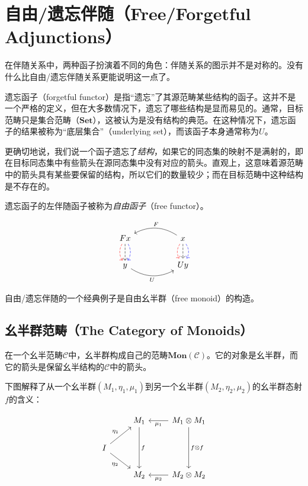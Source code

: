 \documentclass[DaoFP]{subfiles}
\begin{document}
    \section{自由/遗忘伴随（Free/Forgetful Adjunctions）}
    在伴随关系中，两种函子扮演着不同的角色：伴随关系的图示并不是对称的。没有什么比自由/遗忘伴随关系更能说明这一点了。

    遗忘函子（forgetful functor）是指“遗忘”了其源范畴某些结构的函子。这并不是一个严格的定义，但在大多数情况下，遗忘了哪些结构是显而易见的。通常，目标范畴只是集合范畴（$\mathbf{Set}$），这被认为是没有结构的典范。在这种情况下，遗忘函子的结果被称为“底层集合”（underlying set），而该函子本身通常称为$U$。

    更确切地说，我们说一个函子遗忘了\emph{结构}，如果它的同态集的映射不是满射的，即在目标同态集中有些箭头在源同态集中没有对应的箭头。直观上，这意味着源范畴中的箭头具有某些要保留的结构，所以它们的数量较少；而在目标范畴中这种结构是不存在的。

    遗忘函子的左伴随函子被称为\emph{自由函子}（free functor）。

    \[
        \begin{tikzcd}
            F x
            \arrow[d, bend right, red, dashed]
            \arrow[d, dashed]
            \arrow[d, bend left, blue, dashed]
            &&
            x
            \arrow[d, bend right, red, dashed]
            \arrow[d, dashed]
            \arrow[d, bend left, blue, dashed]
            \arrow[ll, bend right, "F"']
            \\
            y
            \arrow[rr, bend right, "U"']
            &&
            U y
        \end{tikzcd}
    \]

    自由/遗忘伴随的一个经典例子是自由幺半群（free monoid）的构造。

    \subsection{幺半群范畴（The Category of Monoids）}
    在一个幺半范畴$\mathcal{C}$中，幺半群构成自己的范畴$\mathbf{Mon}(\mathcal{C})$。它的对象是幺半群，而它的箭头是保留幺半结构的$\mathcal{C}$中的箭头。

    下图解释了从一个幺半群$(M_1, \eta_1, \mu_1)$到另一个幺半群$(M_2, \eta_2, \mu_2)$的幺半群态射$f$的含义：

    \[
        \begin{tikzcd}
            & M_1
            \arrow[dd, "f"]
            & M_1 \otimes M_1
            \arrow[l, "\mu_1"]
            \arrow[dd, "f \otimes f"]
            \\
            I
            \arrow[ru, "\eta_1"]
            \arrow[rd, "\eta_2"']
            \\
            & M_2
            & M_2 \otimes M_2
            \arrow[l, "\mu_2"]
        \end{tikzcd}
    \]
\end{document}
